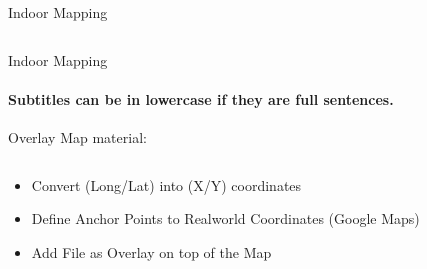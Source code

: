 \documentclass[11pt]{beamer}
\begin{document}
\begin{frame}{Indoor Mapping}
\begin{columns}[T]
\begin{column}{.4\textwidth}
  \end{column}
\end{columns}

\end{frame}


\begin{frame}{Indoor Mapping}

\framesubtitle{Subtitles can be in lowercase if they are full sentences.}
Overlay Map material:

  \begin{columns}[T]
  \begin{column}{.6\textwidth}
  \begin{itemize}
    \item Convert (Long/Lat) into (X/Y) coordinates
    \item Define Anchor Points to Realworld Coordinates (Google Maps)
    \item Add File as Overlay on top of the Map
  \end{itemize}
  \end{column}
  \begin{column}{.4\textwidth}

\end{column}
\end{columns}
\end{frame}
\end{document}
